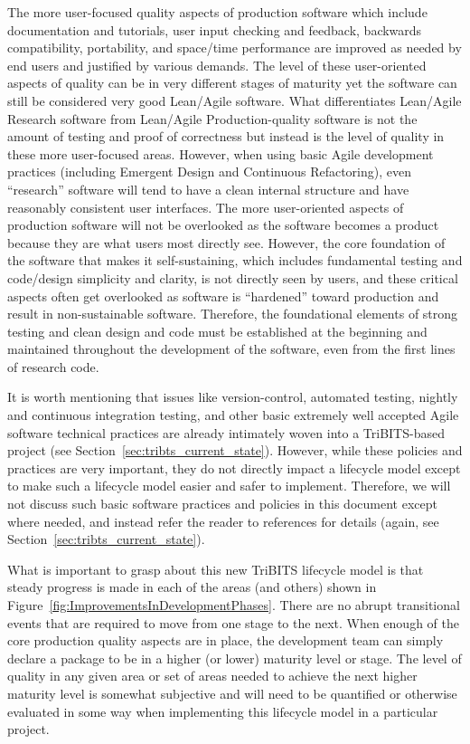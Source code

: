 \documentclass[11pt]{SANDreport}
\begin{document}
The more user-focused quality aspects of production software which
include documentation and tutorials, user input checking and feedback,
backwards compatibility, portability, and space/time performance are
improved as needed by end users and justified by various demands.  The
level of these user-oriented aspects of quality can be in very
different stages of maturity yet the software can still be considered
very good Lean/Agile software.  What differentiates Lean/Agile
Research software from Lean/Agile Production-quality software is not
the amount of testing and proof of correctness but instead is the
level of quality in these more user-focused areas.  However, when
using basic Agile development practices (including Emergent Design and
Continuous Refactoring), even ``research'' software will tend to have
a clean internal structure and have reasonably consistent user
interfaces.  The more user-oriented aspects of production software
will not be overlooked as the software becomes a product because they
are what users most directly see.  However, the core foundation of the
software that makes it self-sustaining, which includes fundamental
testing and code/design simplicity and clarity, is not directly seen
by users, and these critical aspects often get overlooked as software
is ``hardened'' toward production and result in non-sustainable
software.  Therefore, the foundational elements of strong testing and
clean design and code must be established at the beginning and
maintained throughout the development of the software, even from the
first lines of research code.

It is worth mentioning that issues like version-control, automated
testing, nightly and continuous integration testing, and other basic
extremely well accepted Agile software technical practices are already
intimately woven into a TriBITS-based project (see
Section~\ref{sec:tribts_current_state}).  However, while these
policies and practices are very important, they do not directly impact
a lifecycle model except to make such a lifecycle model easier and
safer to implement.  Therefore, we will not discuss such basic
software practices and policies in this document except where needed,
and instead refer the reader to references for details (again, see
Section~\ref{sec:tribts_current_state}).

What is important to grasp about this new TriBITS lifecycle model is
that steady progress is made in each of the areas (and others) shown
in Figure~\ref{fig:ImprovementsInDevelopmentPhases}.  There are no
abrupt transitional events that are required to move from one stage to
the next.  When enough of the core production quality aspects are in
place, the development team can simply declare a package to be in a
higher (or lower) maturity level or stage.  The level of quality in
any given area or set of areas needed to achieve the next higher
maturity level is somewhat subjective and will need to be quantified
or otherwise evaluated in some way when implementing this lifecycle
model in a particular project.
\end{document}
